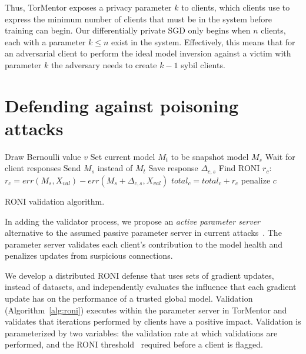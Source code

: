 Thus, TorMentor exposes a privacy parameter $k$ to clients, which
clients use to express the minimum number of clients that must be in
the system before training can begin. Our differentially private SGD
only begins when $n$ clients, each with a parameter $k \le n$ exist in
the system. Effectively, this means that for an adversarial client to
perform the ideal model inversion against a victim with parameter $k$
the adversary needs to create $k-1$ sybil clients.

\section{Defending against poisoning attacks}
\label{validator}

\begin{algorithm}[t]
   {
    Draw Bernoulli value $v$\;
     {
      Set current model $M_t$ to be snapshot model $M_s$\;
      Wait for client responses\;
    }
     {
      Send $M_s$ instead of $M_t$\;
      Save response $\Delta_{c,s}$
    }
     {
       Find RONI $r_c$:
       $r_c = err(M_s, X_{val}) - err(M_s + \Delta_{c,s}, X_{val})$\; 
       $total_c = total_c + r_c$\;
       {
        penalize $c$\;
      }
    }
  }
  \caption{RONI validation algorithm. \label{alg:roni}}
\end{algorithm}

In adding the validator process, we propose an \emph{active parameter
server} alternative to the assumed passive parameter server in current
attacks~\cite{Hitaj:2017}. The parameter server validates each client's
contribution to the model health and penalizes updates from suspicious
connections. 

We develop a distributed RONI defense that uses sets of gradient
updates, instead of datasets, and independently evaluates the influence
that each gradient update has on the performance of a trusted global
model. Validation (Algorithm~\ref{alg:roni}) executes within the
parameter server in TorMentor and validates that iterations performed
by clients have a positive impact. Validation is parameterized by two
variables: the validation rate at which validations are performed, and
the RONI threshold~\cite{Barreno:2010} required before a client is
flagged.

